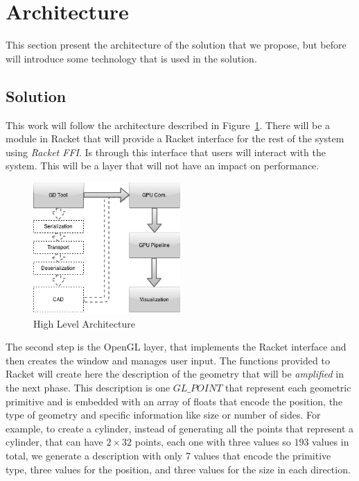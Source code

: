 
%
%

\section{Architecture} %
\label{sec:architecture}

This section present the architecture of the solution that we propose, but before will introduce some technology that is used in the solution.



\subsection{Solution} %
\label{sub:solution}

This work will follow the architecture described in Figure~\ref{fig:architecture}.
There will be a module in Racket that will provide a Racket interface for the rest of the system using \emph{Racket FFI}. 
Is through this interface that users will interact with the system. This will be a layer that will not have an impact on performance.


\begin{figure}
	\vspace{-15pt}
    \centering
	\includegraphics[width=0.5\textwidth]{img/Architecture/GD-Fast-Pipeline.png}
	\caption{High Level Architecture}
	\label{fig:architecture}
	\vspace{-15pt}
\end{figure}

The second step is the OpenGL layer, that implements the Racket interface and then creates the window and manages user input. The functions provided to
Racket will create here the description of the geometry that will be \emph{amplified} in the next phase. This description is one $GL\_POINT$ that
represent each geometric primitive and is embedded with an array of floats that encode the position, the type of geometry and specific information like
size or number of sides. For example, to create a cylinder, instead of generating all the points that represent a cylinder, that can have $2\times 32$ points, each one with three values so $193$ values in total, we generate a description with only 7 values that encode the primitive type, three values for the position, and three values for the size in each direction.

